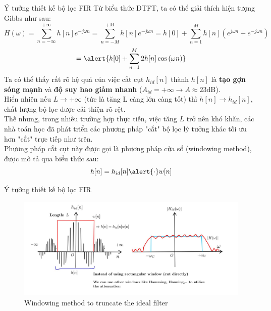 \documentclass[8pt]{beamer}
\begin{document}
\begin{frame}{Ý tưởng thiết kế bộ lọc FIR}
	Từ biểu thức DTFT, ta có thể giải thích hiện tượng Gibbs như sau:
	$$H(\omega)=\sum_{n=-\infty}^{+\infty}h[n]e^{-j\omega n}=\sum_{n=-M}^{+M}h[n]e^{-j\omega n}=h[0]+\sum_{n=1}^{M}h[n](e^{j\omega n}+e^{-j\omega n})$$$$=\alert{h[0]+\sum_{n=1}^{M}2h[n]\cos{(\omega n)}}$$
	Ta có thể thấy rất rõ hệ quả của việc cắt cụt $h_{id}[n]$ thành $h[n]$ là \textbf{tạo gợn sóng mạnh} và \textbf{độ suy hao giảm nhanh} ($A_{id}=+\infty\to A\approx 23\text{dB}$).
	\\ Hiển nhiên nếu $L\to+\infty$ (tức là tăng L càng lớn càng tốt) thì $h[n]\to h_{id}[n]$, chất lượng bộ lọc được cải thiện rõ rệt.
	\\ Thế nhưng, trong nhiều trường hợp thực tiễn, việc tăng $L$ trở nên khó khăn, các nhà toán học đã phát triển các phương pháp "cắt" bộ lọc lý tưởng khác tối ưu hơn "cắt" trực tiếp như trên.
	\\  Phương pháp cắt cụt này được gọi là \alert{phương pháp cửa sổ (windowing method)}, được mô tả qua biểu thức sau: $$h[n]=h_{id}[n]\alert{\cdot}w[n]$$
\end{frame}
\begin{frame}{Ý tưởng thiết kế bộ lọc FIR}
	\begin{figure}[h]
		\includegraphics[width=1.1\textwidth]{4.jpg}
		\caption{Windowing method to truncate the ideal filter}			\label{fig:re4}
	\end{figure}

\end{frame}
\end{document}
